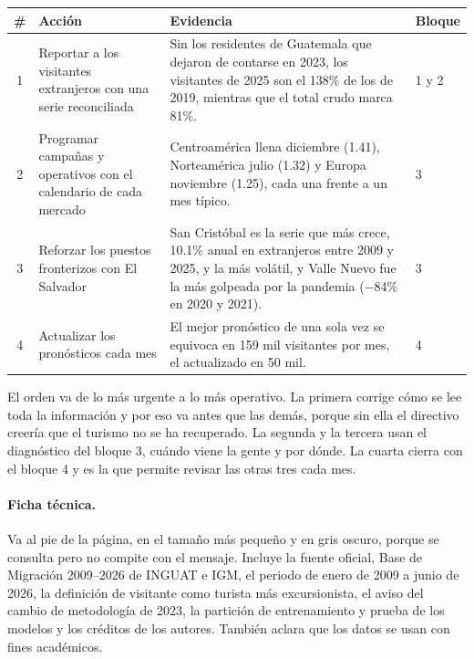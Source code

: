\begin{center}
\begin{tabularx}{\textwidth}{@{}clXl@{}}
\toprule
\# & Acción & Evidencia & Bloque \\
\midrule
1 & Reportar a los visitantes extranjeros con una serie reconciliada &
Sin los residentes de Guatemala que dejaron de contarse en 2023, los visitantes de 2025 son el
138\% de los de 2019, mientras que el total crudo marca 81\%. & 1 y 2 \\
2 & Programar campañas y operativos con el calendario de cada mercado &
Centroamérica llena diciembre (1.41), Norteamérica julio (1.32) y Europa noviembre (1.25), cada
una frente a un mes típico. & 3 \\
3 & Reforzar los puestos fronterizos con El Salvador &
San Cristóbal es la serie que más crece, 10.1\% anual en extranjeros entre 2009 y 2025, y la más
volátil, y Valle Nuevo fue la más golpeada por la pandemia ($-$84\% en 2020 y 2021). & 3 \\
4 & Actualizar los pronósticos cada mes &
El mejor pronóstico de una sola vez se equivoca en 159 mil visitantes por mes, el actualizado en
50 mil. & 4 \\
\bottomrule
\end{tabularx}
\end{center}

El orden va de lo más urgente a lo más operativo. La primera corrige cómo se lee toda la
información y por eso va antes que las demás, porque sin ella el directivo creería que el turismo
no se ha recuperado. La segunda y la tercera usan el diagnóstico del bloque 3, cuándo viene la
gente y por dónde. La cuarta cierra con el bloque 4 y es la que permite revisar las otras tres
cada mes.

\paragraph{Ficha técnica.} Va al pie de la página, en el tamaño más pequeño y en gris oscuro,
porque se consulta pero no compite con el mensaje. Incluye la fuente oficial, Base de Migración
2009--2026 de INGUAT e IGM, el periodo de enero de 2009 a junio de 2026, la definición de
visitante como turista más excursionista, el aviso del cambio de metodología de 2023, la
partición de entrenamiento y prueba de los modelos y los créditos de los autores. También aclara
que los datos se usan con fines académicos.
